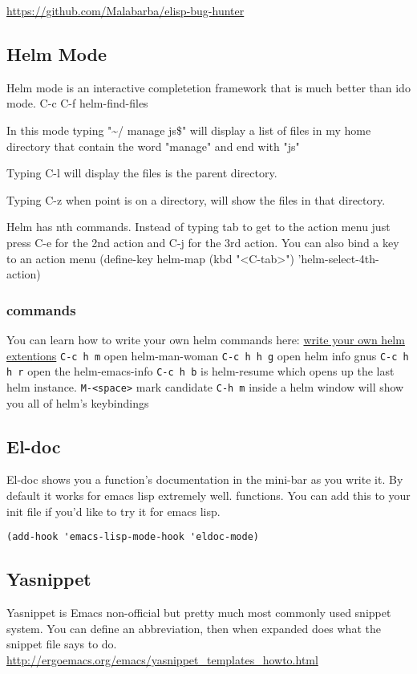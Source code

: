 \documentclass[11pt]{article}
\begin{document}
\url{https://github.com/Malabarba/elisp-bug-hunter}
\subsection{Helm Mode}
\label{sec:orgheadline22}
Helm mode is an interactive completetion framework that is much better than ido mode.
  C-c C-f helm-find-files

In this mode typing "\textasciitilde{}/ manage js\$"
will display a list of files in my home directory that contain the word "manage" and end with "js"

Typing C-l will display the files is the parent directory.

Typing C-z when point is on a directory, will show the files in that directory.

Helm has nth commands. Instead of typing tab to get to the action menu
just press C-e for the 2nd action
and C-j for the 3rd action.
You can also bind a key to an action menu
(define-key helm-map (kbd "<C-tab>") 'helm-select-4th-action)

\subsubsection{commands}
\label{sec:orgheadline21}
You can learn how to write your own helm commands here: \href{http://wikemacs.org/wiki/How_to_write_helm_extensions}{write your own helm extentions}
  \texttt{C-c h m}  open helm-man-woman
  \texttt{C-c h h g} open helm info gnus
  \texttt{C-c h h r} open the helm-emacs-info
  \texttt{C-c h b} is helm-resume which opens up the last helm instance.
  \texttt{M-<space>} mark candidate
  \texttt{C-h m} inside a helm window will show you all of helm's keybindings
\subsection{El-doc}
\label{sec:orgheadline23}
El-doc shows you a function's documentation in the mini-bar as you write it.  By default it works for emacs lisp extremely well.  functions.  You can add this to your init file if you'd like to try it for emacs lisp.
\begin{verbatim}
(add-hook 'emacs-lisp-mode-hook 'eldoc-mode)
\end{verbatim}

\subsection{Yasnippet}
\label{sec:orgheadline25}
Yasnippet is Emacs non-official but pretty much most commonly used snippet system.  You can define an abbreviation, then when expanded does what the snippet file says to do.
\url{http://ergoemacs.org/emacs/yasnippet_templates_howto.html}
\end{document}
